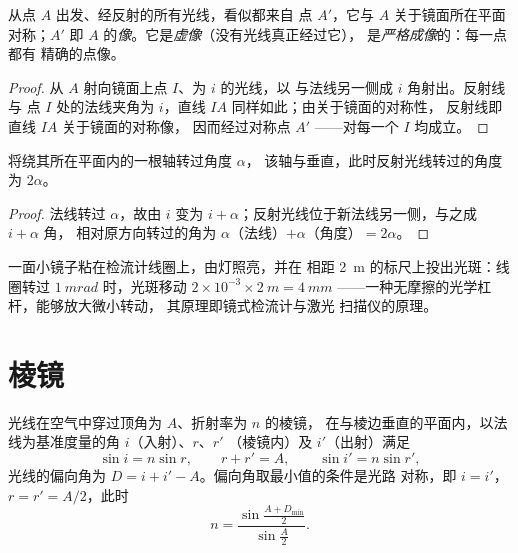 \begin{proposition}[平面镜成像]\label{prop:b1:rays-reflection-refraction:mirror}
从点 $A$ 出发、经反射的所有光线，看似都来自
点 $A'$，它与 $A$ 关于镜面所在平面对称；$A'$
即 $A$ 的\emph{像}。它是\emph{虚像}（没有光线真正经过它），
是\emph{严格成像}的：每一点都有
精确的点像。
\end{proposition}

\begin{proof}
从 $A$ 射向镜面上点 $I$、为 $i$ 的光线，以
与法线另一侧成 $i$ 角射出。反射线与
点 $I$ 处的法线夹角为 $i$，直线 $IA$ 同样如此；由关于镜面的对称性，
反射线即直线 $IA$ 关于镜面的对称像，
因而经过对称点 $A'$ ——对每一个
$I$ 均成立。
\end{proof}

\begin{proposition}[转动平面镜]\label{prop:b1:rays-reflection-refraction:rotation}
将绕其所在平面内的一根轴转过角度 $\alpha$，
该轴与垂直，此时反射光线转过的角度为
$2\alpha$。
\end{proposition}

\begin{proof}
法线转过 $\alpha$，故由 $i$ 变为
$i + \alpha$；反射光线位于新法线另一侧，与之成 $i + \alpha$ 角，
相对原方向转过的角为 $\alpha$（法线）$+ \alpha$（角度）$=
2\alpha$。
\end{proof}

\begin{example}[检流计的杠杆]\label{ex:b1:rays-reflection-refraction:galvanometer}
一面小镜子粘在检流计线圈上，由灯照亮，并在
相距 \qty{2}{m} 的标尺上投出光斑：线圈转过
$\qty{1}{mrad}$ 时，光斑移动 $2 \times 10^{-3} \times
\qty{2}{m} = \qty{4}{mm}$ ——一种无摩擦的光学杠杆，能够放大微小转动，
其原理即镜式检流计与激光
扫描仪的原理。
\end{example}

\section{棱镜}

\begin{proposition}[棱镜公式]\label{prop:b1:rays-reflection-refraction:prism}
光线在空气中穿过顶角为 $A$、折射率为 $n$ 的棱镜，
在与棱边垂直的平面内，以法线为基准度量的角 $i$（入射）、$r$、$r'$
（棱镜内）及 $i'$（出射）满足
\[
\sin i = n \sin r, \qquad r + r' = A, \qquad \sin i' = n \sin r',
\]
光线的偏向角为 $D = i + i' - A$。偏向角取最小值的条件是光路
对称，即 $i = i'$，$r = r' = A/2$，此时
\[
n = \frac{\sin\frac{A + D_{\min}}{2}}{\sin\frac{A}{2}} .
\]
\end{proposition}

